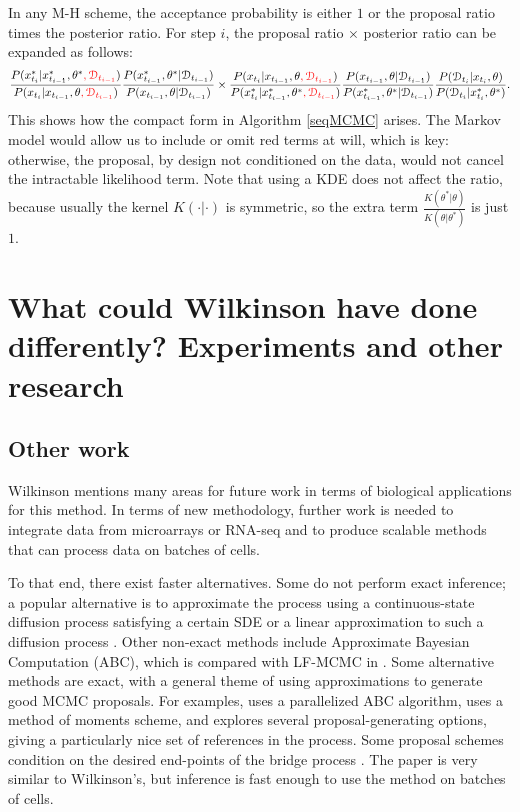 \documentclass{article}
\newcommand\red[1]{\textcolor{red}{#1}}
\begin{document}
In any M-H scheme, the acceptance probability is either $1$ or the proposal ratio times the posterior ratio. For step $i$, the proposal ratio $\times$ posterior ratio can be expanded as follows:
$$ \frac{P(x_{t_{i}}^*| x_{t_{i-1}}^*,\theta^*\red{, \mathcal{D}_{t_{i-1}}})}{P(x_{t_{i}}| x_{t_{i-1}}, \theta \red{, \mathcal{D}_{t_{i-1}}})} 
\frac{P(x_{t_{i-1}}^*,\theta^*| \mathcal{D}_{t_{i-1}})}{P(x_{t_{i-1}}, \theta| \mathcal{D}_{t_{i-1}})}
\times 
\frac{P(x_{t_{i}}| x_{t_{i-1}}, \theta \red{, \mathcal{D}_{t_{i-1}}})}{P(x_{t_{i}}^*| x_{t_{i-1}}^*,\theta^*\red{, \mathcal{D}_{t_{i-1}}})}
\frac{ P(x_{t_{i-1}}, \theta| \mathcal{D}_{t_{i-1}})}{ P( x_{t_{i-1}}^*,\theta^*| \mathcal{D}_{t_{i-1}})}   
\frac{P(\mathcal{D}_{t_{i}}|x_{t_{i}}, \theta)}{P(\mathcal{D}_{t_{i}}|x_{t_{i}}^*, \theta^*)}.$$   
This shows how the compact form in Algorithm \ref{seqMCMC} arises. The Markov model would allow us to include or omit red terms at will, which is key: otherwise, the proposal, by design not conditioned on the data, would not cancel the intractable likelihood term. Note that using a KDE does not affect the ratio, because usually the kernel $K(\cdot|\cdot)$ is symmetric, so the extra term $\frac{K(\theta^*|\theta)}{K(\theta|\theta^*)}$ is just $1$.

\section{What could Wilkinson have done differently? Experiments and other research}


\subsection{Other work}
Wilkinson mentions many areas for future work in terms of biological applications for this method. In terms of new methodology, further work is needed to integrate data from microarrays or RNA-seq and to produce scalable methods that can process data on batches of cells.

To that end, there exist faster alternatives.  Some do not perform exact inference; a popular alternative is to approximate the process using a continuous-state diffusion process satisfying a certain SDE \cite{golightly2005bayesian,bayes_stoch_mod} or a linear approximation to such a diffusion process \cite{fearnhead2014inference}. Other non-exact methods include Approximate Bayesian Computation (ABC), which is compared with LF-MCMC in \cite{owen2014ABC_LF-MCMCcomparison}. Some alternative methods are exact, with a general theme of using approximations to generate good MCMC proposals. For examples, \cite{owen2014scalable} uses a parallelized ABC algorithm, \cite{milner2013moment} uses a method of moments scheme, and \cite{golightly2014smc_b_subtilis} explores several proposal-generating options, giving a particularly nice set of references in the process. Some proposal schemes condition on the desired end-points of the bridge process \cite{hobolth2009simulation}. The paper \cite{zechner2014scalable} is very similar to Wilkinson's, but inference is fast enough to use the method on batches of cells.
\end{document}
